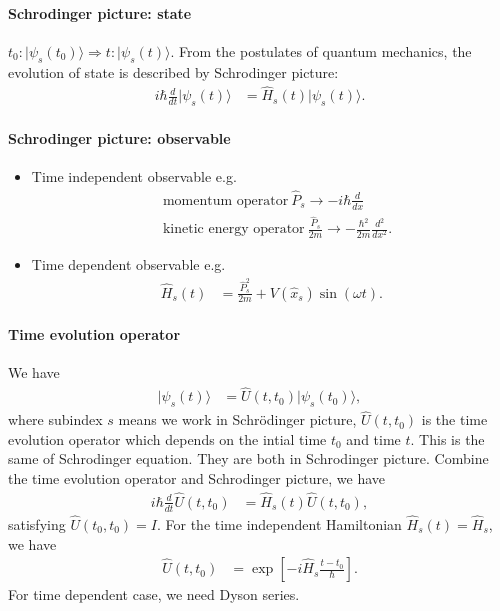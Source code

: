 \documentclass[../../note.tex]{subfiles}
\begin{document}
\paragraph{Schrodinger picture: state}
$t_0: \vert \psi_s(t_0) \rangle \Longrightarrow t: \vert \psi_s(t) \rangle$. From the postulates of quantum mechanics, the evolution of state is described by Schrodinger picture:
\begin{align}
    i \hbar \frac{d}{d t} \vert \psi_s(t) \rangle
    &= \hat{H}_s(t) \vert \psi_s(t) \rangle.
\end{align}

\paragraph{Schrodinger picture: observable}
\begin{itemize}
    \item Time independent observable e.g.
    \begin{align}
        &\textrm{momentum operator}~\hat{P}_s \longrightarrow - i \hbar \frac{d}{d x} \\
        &\textrm{kinetic energy operator}~\frac{\hat{P}_s}{2 m} \longrightarrow - \frac{\hbar^2}{2 m }\frac{d^2}{d x^2}.
    \end{align}
    \item Time dependent observable e.g.
    \begin{align}
        \hat{H}_s(t)
        &= \frac{\hat{P}_s^2}{2 m} + V(\hat{x}_s) \sin(\omega t).
    \end{align}
\end{itemize}

\paragraph{Time evolution operator}
We have
\begin{align}
    \vert \psi_s(t) \rangle 
    &= \hat{U}(t, t_0) \vert \psi_s(t_0) \rangle,
\end{align}
where subindex $s$ means we work in Schrödinger picture, $\hat{U}(t,t_0)$ is the time evolution operator which depends on the intial time $t_0$ and time $t$. This is the same of Schrodinger equation. They are both in Schrodinger picture. Combine the time evolution operator and Schrodinger picture, we have
\begin{align}
    \label{eq: combine the time evolution operator and Schrodinger picture}
    i \hbar \frac{d}{d t}\hat{U}(t, t_0)
    &= \hat{H}_s(t) \hat{U}(t,t_0),
\end{align}
satisfying $\hat{U}(t_0,t_0) = I$. For the time independent Hamiltonian $\hat{H}_s(t) = \hat{H}_s$, we have
\begin{align}
    \hat{U}(t,t_0)
    &= \exp\left[-i \hat{H}_s \frac{t-t_0}{\hbar} \right].
\end{align}
For time dependent case, we need Dyson series.
\end{document}
